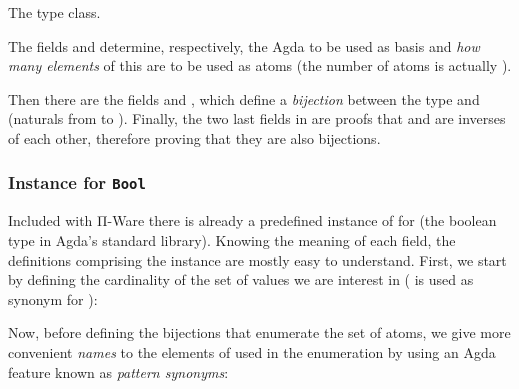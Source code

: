             \begin{listing}[h]
                \caption{The  type class.\label{lst:atomic}}
            \end{listing}

            The fields  and  determine, respectively,
            the Agda  to be used as basis and \emph{how many elements} of this 
            are to be used as atoms (the number of atoms is actually  \AY{=}  ).

            Then there are the fields  and , which define a \emph{bijection}
            between the  type and   (naturals from  to ).
            Finally, the two last fields in  are proofs
            that  and  are inverses of each other,
            therefore proving that they are also bijections.

            \subsubsection{Instance for \texttt{Bool}}
            Included with Π-Ware there is already a predefined instance of  for 
            (the boolean type in Agda's standard library).
            Knowing the meaning of each field, the definitions comprising the instance
            are mostly easy to understand.
            First, we start by defining the cardinality of the set of values we are interest in
            ( is used as synonym for ):

            \begin{center}
            \end{center}

            Now, before defining the bijections that enumerate the set of atoms,
            we give more convenient \emph{names} to the elements of   used in the enumeration
            by using an Agda feature known as \emph{pattern synonyms}:

            \begin{center}
            \end{center}

